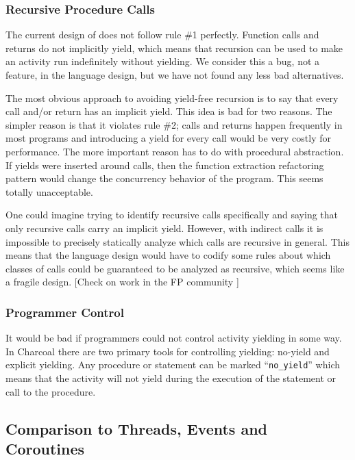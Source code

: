 \documentclass[10pt,preprint]{sigplanconf}
\begin{document}
\subsubsection{Recursive Procedure Calls}

The current design of \charcoal{} does not follow rule \#1 perfectly.
Function calls and returns do not implicitly yield, which means that recursion can be used to make an activity run indefinitely without yielding.
We consider this a bug, not a feature, in the language design, but we have not found any less bad alternatives.

The most obvious approach to avoiding yield-free recursion is to say that every call and/or return has an implicit yield.
This idea is bad for two reasons.
The simpler reason is that it violates rule \#2; calls and returns happen frequently in most programs and introducing a yield for every call would be very costly for performance.
The more important reason has to do with procedural abstraction.
If yields were inserted around calls, then the function extraction refactoring pattern would change the concurrency behavior of the program.
This seems totally unacceptable.

One could imagine trying to identify recursive calls specifically and saying that only recursive calls carry an implicit yield.
However, with indirect calls it is impossible to precisely statically analyze which calls are recursive in general.
This means that the language design would have to codify some rules about which classes of calls could be guaranteed to be analyzed as recursive, which seems like a fragile design.
[Check on work in the FP community ]

\subsubsection{Programmer Control}

It would be bad if programmers could not control activity yielding in some way.
In Charcoal there are two primary tools for controlling yielding: no-yield and explicit yielding.
Any procedure or statement can be marked ``\texttt{no\_yield}'' which means that the activity will not yield during the execution of the statement or call to the procedure.

\subsection{Comparison to Threads, Events and Coroutines}
\end{document}
